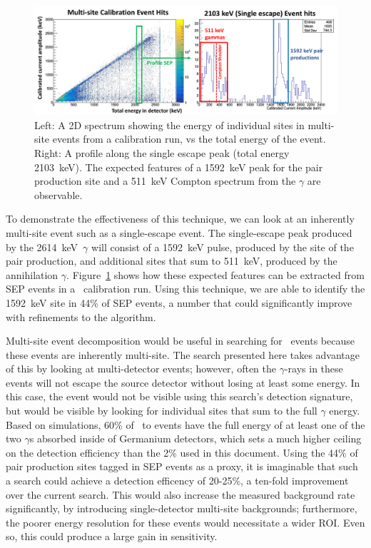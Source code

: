 \documentclass[/main.tex]{subfiles}
\begin{document}
\begin{figure}[h]
  \centering
  \includegraphics[width=\textwidth]{decomposedspectrum}
  \caption[Decomposed SEP spectrum]{\label{fig:eventdecompspectrum}
    Left: A 2D spectrum showing the energy of individual sites in multi-site events from a  calibration run, vs the total energy of the event.\\
    Right: A profile along the single escape peak (total energy 2103~keV). The expected features of a 1592~keV peak for the pair production site and a 511~keV Compton spectrum from the $\gamma$ are observable.
  }
\end{figure}
To demonstrate the effectiveness of this technique, we can look at an inherently multi-site event such as a single-escape event.
The single-escape peak produced by the  2614~keV~$\gamma$ will consist of a 1592~keV pulse, produced by the site of the pair production, and additional sites that sum to 511~keV, produced by the annihilation $\gamma$.
Figure~\ref{fig:eventdecompspectrum} shows how these expected features can be extracted from SEP events in a \MJD\ calibration run.
Using this technique, we are able to identify the 1592~keV site in 44\% of SEP events, a number that could significantly improve with refinements to the algorithm.

Multi-site event decomposition would be useful in searching for \bbes\ events because these events are inherently multi-site.
The search presented here takes advantage of this by looking at multi-detector events; however, often the $\gamma$-rays in these events will not escape the source detector without losing at least some energy.
In this case, the event would not be visible using this search's detection signature, but would be visible by looking for individual sites that sum to the full $\gamma$ energy.
Based on simulations, 60\% of \tnbb\ to  events have the full energy of at least one of the two $\gamma$s absorbed inside of Germanium detectors, which sets a much higher ceiling on the detection efficiency than the 2\% used in this document.
Using the 44\% of pair production sites tagged in SEP events as a proxy, it is imaginable that such a search could achieve a detection efficency of 20-25\%, a ten-fold improvement over the current search.
This would also increase the measured background rate significantly, by introducing single-detector multi-site backgrounds; furthermore, the poorer energy resolution for these events would necessitate a wider ROI.
Even so, this could produce a large gain in sensitivity.
\end{document}
